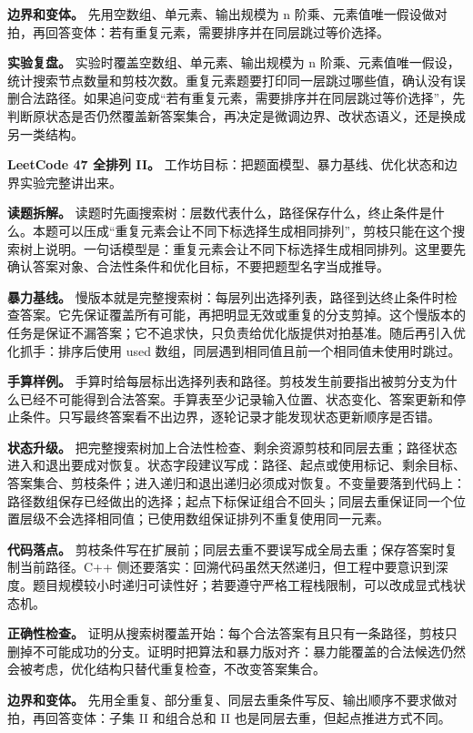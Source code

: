 \textbf{边界和变体。} 先用空数组、单元素、输出规模为 n 阶乘、元素值唯一假设做对拍，再回答变体：若有重复元素，需要排序并在同层跳过等价选择。

\textbf{实验复盘。} 实验时覆盖空数组、单元素、输出规模为 n 阶乘、元素值唯一假设，统计搜索节点数量和剪枝次数。重复元素题要打印同一层跳过哪些值，确认没有误删合法路径。如果追问变成“若有重复元素，需要排序并在同层跳过等价选择”，先判断原状态是否仍然覆盖新答案集合，再决定是微调边界、改状态语义，还是换成另一类结构。

\noindent\textbf{LeetCode 47 全排列 II。} 工作坊目标：把题面模型、暴力基线、优化状态和边界实验完整讲出来。

\textbf{读题拆解。} 读题时先画搜索树：层数代表什么，路径保存什么，终止条件是什么。本题可以压成“重复元素会让不同下标选择生成相同排列”，剪枝只能在这个搜索树上说明。一句话模型是：重复元素会让不同下标选择生成相同排列。这里要先确认答案对象、合法性条件和优化目标，不要把题型名字当成推导。

\textbf{暴力基线。} 慢版本就是完整搜索树：每层列出选择列表，路径到达终止条件时检查答案。它先保证覆盖所有可能，再把明显无效或重复的分支剪掉。这个慢版本的任务是保证不漏答案；它不追求快，只负责给优化版提供对拍基准。随后再引入优化抓手：排序后使用 used 数组，同层遇到相同值且前一个相同值未使用时跳过。

\textbf{手算样例。} 手算时给每层标出选择列表和路径。剪枝发生前要指出被剪分支为什么已经不可能得到合法答案。手算表至少记录输入位置、状态变化、答案更新和停止条件。只写最终答案看不出边界，逐轮记录才能发现状态更新顺序是否错。

\textbf{状态升级。} 把完整搜索树加上合法性检查、剩余资源剪枝和同层去重；路径状态进入和退出要成对恢复。状态字段建议写成：路径、起点或使用标记、剩余目标、答案集合、剪枝条件；进入递归和退出递归必须成对恢复。不变量要落到代码上：路径数组保存已经做出的选择；起点下标保证组合不回头；同层去重保证同一个位置层级不会选择相同值；已使用数组保证排列不重复使用同一元素。

\textbf{代码落点。} 剪枝条件写在扩展前；同层去重不要误写成全局去重；保存答案时复制当前路径。C++ 侧还要落实：回溯代码虽然天然递归，但工程中要意识到深度。题目规模较小时递归可读性好；若要遵守严格工程栈限制，可以改成显式栈状态机。

\textbf{正确性检查。} 证明从搜索树覆盖开始：每个合法答案有且只有一条路径，剪枝只删掉不可能成功的分支。证明时把算法和暴力版对齐：暴力能覆盖的合法候选仍然会被考虑，优化结构只替代重复检查，不改变答案集合。

\textbf{边界和变体。} 先用全重复、部分重复、同层去重条件写反、输出顺序不要求做对拍，再回答变体：子集 II 和组合总和 II 也是同层去重，但起点推进方式不同。

